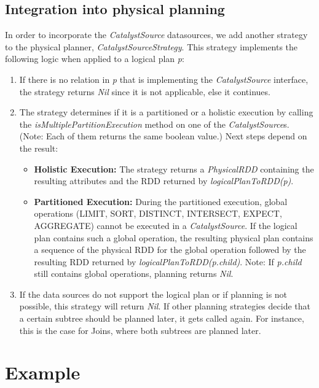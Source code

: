 \documentclass{article}
\begin{document}
\subsection{Integration into physical planning}

In order to incorporate the \textit{CatalystSource} datasources, we add another strategy to the physical planner, \textit{CatalystSourceStrategy}. This strategy implements the following logic when applied to a logical plan \textit{p}:

\begin{enumerate}
  \item If there is no relation in \textit{p} that is implementing the \textit{CatalystSource} interface, the strategy returns \textit{Nil} since it is not applicable, else it continues.
  \item The strategy determines if it is a partitioned or a holistic execution by calling the \textit{isMultiplePartitionExecution} method on one of the \textit{CatalystSource}s. (Note: Each of them returns the same boolean value.) Next steps depend on the result:
  	\begin{itemize}
  		\item \textbf{Holistic Execution:} The strategy returns a \textit{PhysicalRDD} containing the resulting attributes and the RDD returned by \textit{logicalPlanToRDD(p)}.
  		\item \textbf{Partitioned Execution:} During the partitioned execution, global operations (LIMIT, SORT, DISTINCT, INTERSECT, EXPECT, AGGREGATE) cannot be executed in a \textit{CatalystSource}. If the logical plan contains such a global operation, the resulting physical plan contains a sequence of the physical RDD for the global operation followed by the resulting RDD returned by \textit{logicalPlanToRDD(p.child)}. Note: If \textit{p.child} still contains global operations, planning returns \textit{Nil}. 
	\end{itemize}
	\item If the data sources do not support the logical plan or if planning is not possible, this strategy will return \textit{Nil}. If other planning strategies decide that a certain subtree should be planned later, it gets called again. For instance, this is the case for Joins, where both subtrees are planned later.
\end{enumerate}

\section{Example}
\end{document}
